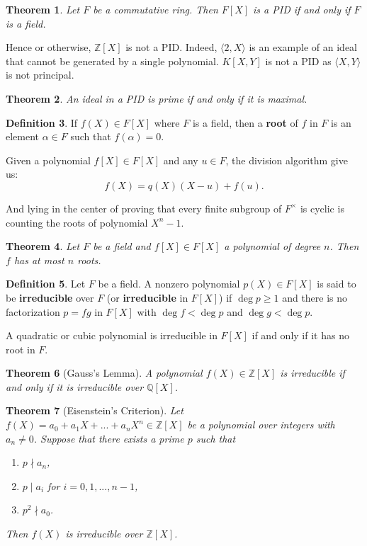 \documentclass[12pt]{article}
\newtheorem{thm}{Theorem}[section]
\theoremstyle{definition}
\theoremstyle{definition}
\newtheorem{defn}[thm]{Definition}
\def\ZZ{\mathbb{Z}}
\def\QQ{\mathbb{Q}}
\begin{document}
\begin{thm}
Let $F$ be a commutative ring. Then $F[X]$ is a PID if and only if $F$ is a field.
\end{thm}

Hence or otherwise, $\ZZ[X]$ is not a PID. Indeed, $\langle 2, X\rangle$ is an example of an ideal that cannot be generated by a single polynomial. $K[X,Y]$ is not a PID as $\langle X, Y \rangle$ is not principal.

\begin{thm}
    An ideal in a PID is prime if and only if it is maximal.
\end{thm}

\smallskip

\begin{defn}
    If $f(X)\in F[X]$ where $F$ is a field, then a \textbf{root} of $f$ in $F$ is an element $\alpha\in F$ such that $f(\alpha)=0$.
\end{defn}

Given a polynomial $f[X]\in F[X]$ and any $u\in F$, the division algorithm give us: $$f(X)= q(X)(X-u)+f(u).$$

And lying in the center of proving that every finite subgroup of $F^\times$ is cyclic is counting the roots of polynomial $X^n-1$.

\begin{thm}
    Let $F$ be a field and $f[X]\in F[X]$ a polynomial of degree $n$. Then $f$ has at most $n$ roots.
\end{thm}

\begin{defn}
    Let $F$ be a field. A nonzero polynomial $p(X) \in F[X]$ is said to be \textbf{irreducible} over $F$ (or \textbf{irreducible} in $F[X]$) if $\deg p \geq 1$ and there is no factorization $p=fg$ in $F[X]$ with $\deg f < \deg p$ and $\deg g < \deg p$.
\end{defn}

A quadratic or cubic polynomial is irreducible in $F[X]$ if and only if it has no root in $F$.

\begin{thm}[Gauss's Lemma]
    A polynomial $f(X)\in \ZZ[X]$ is irreducible if and only if it is irreducible over $\QQ[X]$.
\end{thm}

\begin{thm}[Eisenstein's Criterion]
    Let $f(X) = a_0+a_1X+...+a_nX^n\in \ZZ[X]$ be a polynomial over integers with $a_n\not= 0$. Suppose that there exists a prime $p$ such that \begin{enumerate}
        \item  $p\nmid a_n$, 
        \item  $p\mid a_i$  for  $i=0,1,...,n-1$,
        \item  $p^2\nmid a_0$.
    \end{enumerate}
    Then $f(X)$ is irreducible over $\ZZ[X]$.
\end{thm}
\end{document}
